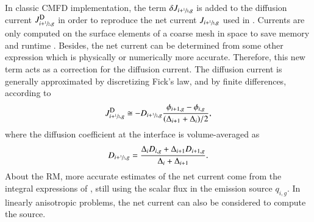 In classic CMFD implementation, the term $\delta J_{i+\sfrac{1}{2},g}$ is added to the diffusion current $\jD_{i+\hzi,g}$ in order to reproduce the net current $J_{i+\sfrac{1}{2},g}$ used in . Currents are only computed on the surface elements of a coarse mesh in space to save memory and runtime \cite{Smith-1983}. Besides, the net current can be determined from some other expression which is physically or numerically more accurate. Therefore, this new term acts as a correction for the diffusion current. The diffusion current is generally approximated by discretizing Fick's law, and by finite differences, according to
\begin{equation}
  \label{eq:JD}
  \jD_{i+\hzi,g} \cong - D_{i+\hzi,g}
    \frac{\phi_{i+1,g} - \phi_{i,g}}{(\Delta_{i+1} + \Delta_i)/2},
\end{equation}
where the diffusion coefficient at the interface is volume-averaged as
\begin{equation}
  \label{eq:Ds}
  D_{i+\sfrac{1}{2},g} = \frac{\Delta_i D_{i,g} + \Delta_{i+1} D_{i+1,g}}
{\Delta_i + \Delta_{i+1}}.
\end{equation}
%
About the RM, more accurate estimates of the net current come from the integral expressions of , still using the scalar flux in the emission source $q_{i,g}$. In linearly anisotropic problems, the net current can also be considered to compute the source.

